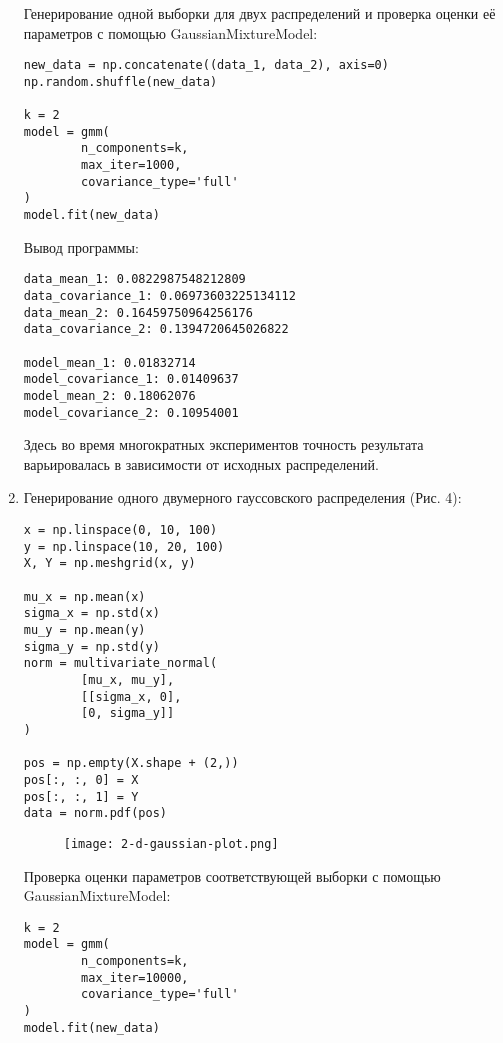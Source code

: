 \begin{enumerate}
{        Генерирование одной выборки для двух распределений и проверка оценки её параметров с помощью GaussianMixtureModel:
        \begin{verbatim}
new_data = np.concatenate((data_1, data_2), axis=0)
np.random.shuffle(new_data)

k = 2
model = gmm(
        n_components=k,
        max_iter=1000,
        covariance_type='full'
)
model.fit(new_data)
        \end{verbatim}
        Вывод программы:
        \begin{verbatim}
data_mean_1: 0.0822987548212809
data_covariance_1: 0.06973603225134112
data_mean_2: 0.16459750964256176
data_covariance_2: 0.1394720645026822

model_mean_1: 0.01832714
model_covariance_1: 0.01409637
model_mean_2: 0.18062076
model_covariance_2: 0.10954001
        \end{verbatim}
        Здесь во время многократных экспериментов точность результата варьировалась в зависимости от исходных распределений.
    }
    \item {
        Генерирование одного двумерного гауссовского распределения (Рис. 4):

        \begin{verbatim}
x = np.linspace(0, 10, 100)
y = np.linspace(10, 20, 100)
X, Y = np.meshgrid(x, y)

mu_x = np.mean(x)
sigma_x = np.std(x)
mu_y = np.mean(y)
sigma_y = np.std(y)
norm = multivariate_normal(
        [mu_x, mu_y],
        [[sigma_x, 0],
        [0, sigma_y]]
)

pos = np.empty(X.shape + (2,))
pos[:, :, 0] = X
pos[:, :, 1] = Y
data = norm.pdf(pos)
        \end{verbatim}
        \begin{figure}[h]
            \begin{center}
                \texttt{[image: 2-d-gaussian-plot.png]}
                \caption{}
                \label{ris:experimcoded}
            \end{center}
        \end{figure}

        Проверка оценки параметров соответствующей выборки с помощью GaussianMixtureModel:
        \begin{verbatim}
k = 2
model = gmm(
        n_components=k,
        max_iter=10000,
        covariance_type='full'
)
model.fit(new_data)
        \end{verbatim}

}
\end{enumerate}
